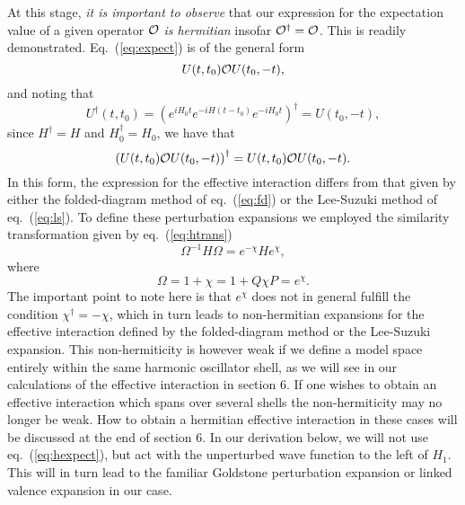 At this stage, {\em it is important to observe} that our 
expression for the expectation value of a given operator ${\cal O}$
{\em is hermitian} insofar ${\cal O}^{\dagger}={\cal O}$. This is readily 
demonstrated. Eq.\ (\ref{eq:expect}) is of the general form
\begin{equation}
U(t,t_0){\cal O}U(t_0,-t),
\end{equation}
and noting that 
\begin{equation}
   U^{\dagger}(t,t_0)=
   \left({\displaystyle e^{iH_0t}e^{-iH(t-t_0)}e^{-iH_0t}}\right)^{\dagger}
   =U(t_0,-t),
\end{equation}
since $H^{\dagger}=H$ and $H_0^{\dagger}=H_0$, we have that
\begin{equation}
    \left(U(t,t_0){\cal O}U(t_0,-t)\right)^{\dagger}
    =U(t,t_0){\cal O}U(t_0,-t).
\end{equation}
In this form, the expression for the effective interaction differs
from that given by either the folded-diagram  method of eq.\ (\ref{eq:fd}) 
or the
Lee-Suzuki method of eq.\ (\ref{eq:ls}). To define these perturbation
expansions we employed the similarity transformation given by eq.\ 
(\ref{eq:htrans})
\begin{equation}
   \Omega^{-1}H\Omega = e^{-\chi}He^{\chi},
\end{equation}
where
\begin{equation}
     \Omega =1+\chi = 1+Q\chi P = e^{\chi}.
\end{equation}
The important point to note here is that $e^{\chi}$ does not in general
fulfill the condition $\chi^{\dagger}=-\chi$, which in turn leads to
non-hermitian expansions for the effective interaction defined by 
the folded-diagram method or the Lee-Suzuki expansion. 
This non-hermiticity is however weak if we define a model space entirely
within the same harmonic oscillator shell, as we will see 
in our calculations of the effective interaction in section 6. 
If one wishes to obtain an effective
interaction which spans over several shells the non-hermiticity may no longer 
be weak. How to obtain a hermitian effective interaction in these 
cases will be discussed at the end of section 6. 
In our derivation below, we will not use eq.\ (\ref{eq:hexpect}), but act 
with the unperturbed wave function to the left of $H_1$. This will in turn
lead to the familiar Goldstone perturbation expansion or linked
valence expansion in our case. 


